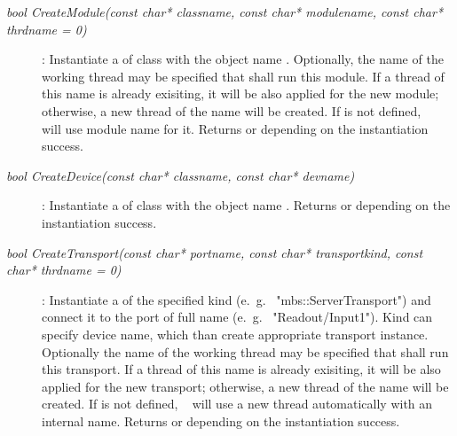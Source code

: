 \begin{description}
	 
\item[\em bool CreateModule\small (const char* classname, const char* modulename, const char* thrdname = 0)] : 
Instantiate a  of class  with the object name
. Optionally, the name of the working thread  may
be specified that shall run this module. If a thread of this name is already exisiting, 
it will be also applied for the new module; otherwise, a new thread of the name
will be created. If  is not defined, \dabc~ will use module name for it.
Returns  or  depending on the instantiation success.

\item[\em bool CreateDevice\small (const char* classname, const char* devname)]:
Instantiate a  of class  with the object name
. Returns  or  depending on the instantiation success.






\item[\em bool CreateTransport\small (const char* portname, const char* transportkind, const char* thrdname = 0)] :
Instantiate a  of the specified kind  (e.~g.~ "mbs::ServerTransport")
and connect it to the port of full name  (e.~g.~ "Readout/Input1").
Kind can specify device name, which than create appropriate transport instance.
Optionally the name of the working thread
 may
be specified that shall run this transport. If a thread of this name is already exisiting, 
it will be also applied for the new transport; otherwise, a new thread of the name
will be created. If  is not defined, \dabc~ will use a new 
thread automatically with an internal name.
Returns  or  depending on the instantiation success.


  

\end{description}
